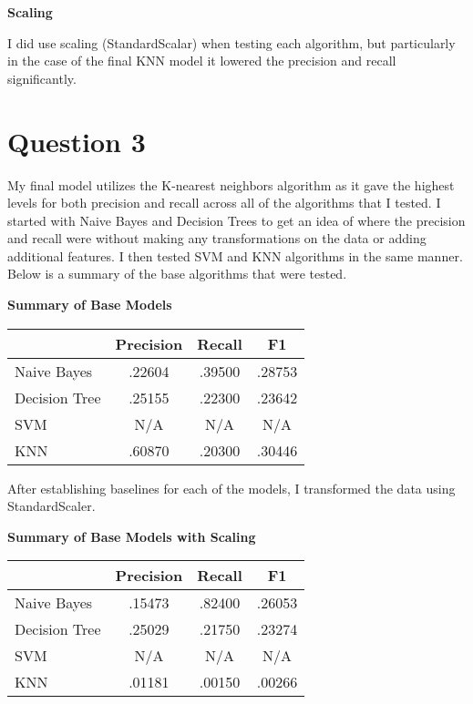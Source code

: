 \documentclass[a4paper,11pt]{report}
\begin{document}
\textbf{Scaling}

I did use scaling (StandardScalar) when testing each algorithm, but particularly
in the case of the final KNN model it lowered the precision and recall
significantly.

\section{Question 3}
  
My final model utilizes the K-nearest neighbors algorithm as it gave the highest
levels for both precision and recall across all of the algorithms that I tested.
I started with Naive Bayes and Decision Trees to get an idea of where the
precision and recall were without making any transformations on the data or
adding additional features.  I then tested SVM and KNN algorithms in the same
manner.  Below is a summary of the base algorithms that were tested.

\textbf{Summary of Base Models}
\begin{center}
    \begin{tabular}{|| l c c c||}
        \hline & Precision & Recall & F1 \\
        \hline\hline
        Naive Bayes & .22604 & .39500 & .28753 \\
        \hline
        Decision Tree & .25155 & .22300 & .23642 \\
        \hline
        SVM & N/A & N/A & N/A \\
        \hline
        KNN & .60870 & .20300 & .30446  \\
        \hline
    \end{tabular}
\end{center}

After establishing baselines for each of the models, I transformed the data
using StandardScaler.

\textbf{Summary of Base Models with Scaling}
\begin{center}
    \begin{tabular}{|| l c c c ||}
        \hline & Precision & Recall & F1 \\
        \hline\hline
        Naive Bayes & .15473 & .82400 & .26053 \\
        \hline
        Decision Tree & .25029 & .21750 & .23274 \\
        \hline
        SVM & N/A & N/A & N/A \\
        \hline
        KNN & .01181 & .00150 & .00266  \\
        \hline
    \end{tabular}
\end{center}
\end{document}
